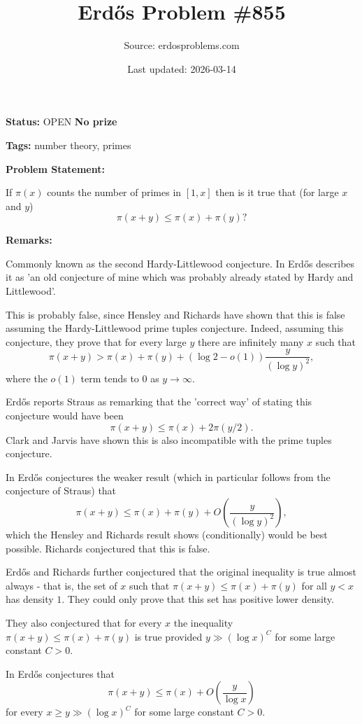\documentclass{article}
\title{Erd\H{o}s Problem \#855}
\date{Last updated: 2026-03-14}
\author{Source: erdosproblems.com}
\begin{document}
\maketitle

\noindent\textbf{Status:} OPEN \quad \textbf{No prize}

\noindent\textbf{Tags:} number theory, primes

\medskip
\noindent\textbf{Problem Statement:}

If $\pi(x)$ counts the number of primes in $[1,x]$ then is it true that (for large $x$ and $y$)\[\pi(x+y) \leq \pi(x)+\pi(y)?\]

\bigskip
\noindent\textbf{Remarks:}

Commonly known as the second Hardy-Littlewood conjecture. In \cite{Er85c} Erd\H{o}s describes it as 'an old conjecture of mine which was probably already stated by Hardy and Littlewood'. 

This is probably false, since Hensley and Richards \cite{HeRi73} have shown that this is false assuming the Hardy-Littlewood prime tuples conjecture. Indeed, assuming this conjecture, they prove that for every large $y$ there are infinitely many $x$ such that\[\pi(x+y)>\pi(x)+\pi(y)+(\log 2-o(1))\frac{y}{(\log y)^2},\]where the $o(1)$ term tends to $0$ as $y\to \infty$.

Erd\H{o}s \cite{Er85c} reports Straus as remarking that the 'correct way' of stating this conjecture would have been\[\pi(x+y) \leq \pi(x)+2\pi(y/2).\]Clark and Jarvis \cite{ClJa01} have shown this is also incompatible with the prime tuples conjecture.

In \cite{Er85c} Erd\H{o}s conjectures the weaker result (which in particular follows from the conjecture of Straus) that\[\pi(x+y) \leq \pi(x)+\pi(y)+O\left(\frac{y}{(\log y)^2}\right),\]which the Hensley and Richards result shows (conditionally) would be best possible. Richards conjectured that this is false.

Erd\H{o}s and Richards further conjectured that the original inequality is true almost always - that is, the set of $x$ such that $\pi(x+y)\leq \pi(x)+\pi(y)$ for all $y<x$ has density $1$. They could only prove that this set has positive lower density.

They also conjectured that for every $x$ the inequality $\pi(x+y)\leq \pi(x)+\pi(y)$ is true provided $y \gg (\log x)^C$ for some large constant $C>0$.

In \cite{Er80} Erd\H{o}s conjectures that\[\pi(x+y)\leq \pi(x)+O\left(\frac{y}{\log x}\right)\]for every $x\geq y \gg (\log x)^C$ for some large constant $C>0$.
\end{document}
